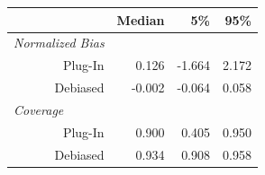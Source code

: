 
\begin{tabular}{r|rrr}
\toprule
  & Median & 5\% & 95\%\\
\midrule
\multicolumn{1}{l|}{\textit{Normalized Bias}}\\
Plug-In & 0.126 & -1.664 & 2.172\\
Debiased & -0.002 & -0.064 & 0.058\\
\midrule
\multicolumn{1}{l|}{\textit{Coverage}}\\
Plug-In & 0.900 & 0.405 & 0.950\\
Debiased & 0.934 & 0.908 & 0.958\\
\bottomrule
\end{tabular}
